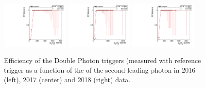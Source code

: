 



\begin{figure}[tbp!]
\begin{center}
\includegraphics[angle=0,width=0.3\textwidth]{fig/eff_2016_Photon2_pt.pdf}
\includegraphics[angle=0,width=0.3\textwidth]{fig/eff_2017_Photon2_pt.pdf}
\includegraphics[angle=0,width=0.3\textwidth]{fig/eff_2018_Photon2_pt.pdf}
\end{center}
\caption{Efficiency of the Double Photon triggers (measured with reference trigger as a function of the \pt of the second-leading photon in 2016 (left), 2017 (center) and 2018 (right) data.}
\label{fig:trigger_efficiency}
\end{figure}


